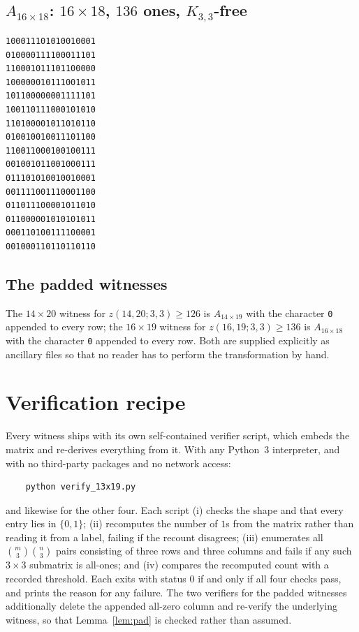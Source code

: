 \documentclass[11pt,reqno]{amsart}
\theoremstyle{plain}
\theoremstyle{remark}
\newcommand{\zz}{z}
\begin{document}
\subsection*{\texorpdfstring{$A_{16\times18}$: $16\times18$, $136$ ones, $K_{3,3}$-free}
                            {A(16x18): 16 x 18, 136 ones, K(3,3)-free}}
\begin{verbatim}
100011101010010001
010000111100011101
110001011101100000
100000010111001011
101100000001111101
100110111000101010
110100001011010110
010010010011101100
110011000100100111
001001011001000111
011101010010010001
001111001110001100
011011100001011010
011000001010101011
000110100111100001
001000110110110110
\end{verbatim}

\subsection*{The padded witnesses}
The $14\times20$ witness for $\zz(14,20;3,3)\ge126$ is $A_{14\times19}$ with the character
\texttt{0} appended to every row; the $16\times19$ witness for $\zz(16,19;3,3)\ge136$ is
$A_{16\times18}$ with the character \texttt{0} appended to every row. Both are supplied explicitly
as ancillary files so that no reader has to perform the transformation by hand.

\section{Verification recipe}\label{sec:verify}

Every witness ships with its own self-contained verifier script, which embeds the matrix and
re-derives everything from it. With any Python~3 interpreter, and with no third-party packages and
no network access:
\begin{verbatim}
    python verify_13x19.py
\end{verbatim}
and likewise for the other four. Each script (i) checks the shape and that every entry lies in
$\{0,1\}$; (ii) recomputes the number of $1$s from the matrix rather than reading it from a label,
failing if the recount disagrees; (iii) enumerates all $\binom{m}{3}\binom{n}{3}$ pairs consisting of
three rows and three columns and fails if any such $3\times3$ submatrix is all-ones; and
(iv) compares the recomputed count with a recorded threshold. Each exits with status $0$ if and only
if all four checks pass, and prints the reason for any failure. The two verifiers for the padded
witnesses additionally delete the appended all-zero column and re-verify the underlying witness, so
that Lemma~\ref{lem:pad} is checked rather than assumed.
\end{document}
